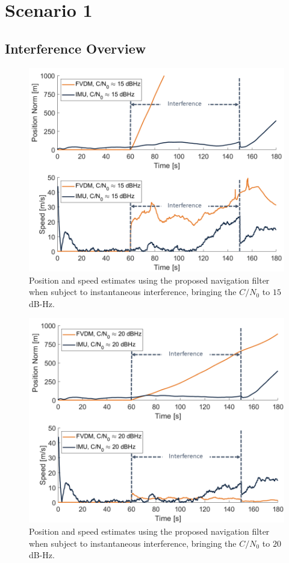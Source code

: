 \section{\textbf{Scenario 1}}

\subsection{\textbf{Interference Overview}}

\begin{figure}[!ht]
    \centering
    \includegraphics[width=0.75\linewidth]{Figures/Results/trajectoryfigure/Slide14.PNG}
    \caption{Position and speed estimates using the proposed navigation filter when subject to instantaneous interference, bringing the \(C/N_0\) to \(15\) dB-Hz.}\label{fig:PosVel15}
\end{figure}

\begin{figure}[!ht]
    \centering
    \includegraphics[width=0.75\linewidth]{Figures/Results/trajectoryfigure/Slide15.PNG}
    \caption{Position and speed estimates using the proposed navigation filter when subject to instantaneous interference, bringing the \(C/N_0\) to \(20\) dB-Hz.}\label{fig:PosVel20}
\end{figure}


